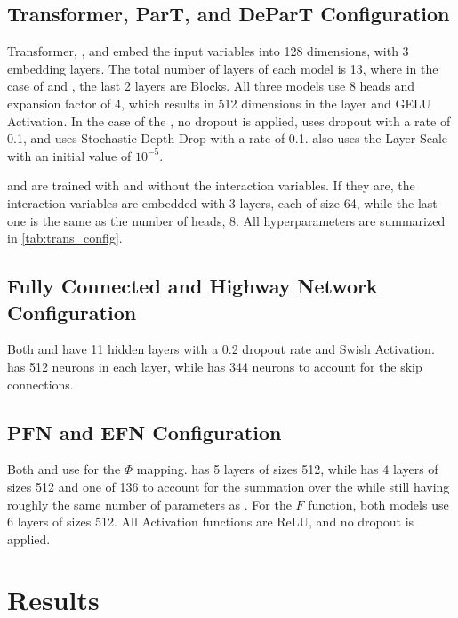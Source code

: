 \subsection{Transformer, ParT, and DeParT Configuration}
\label{sec:transformer_config}

Transformer, \ParT, and \depart embed the input variables into 128 dimensions, with 3 embedding layers.
The total number of layers of each model is 13, where in the case of \depart and \ParT, the last 2 layers are \CA Blocks.
All three models use 8 heads and \FFN expansion factor of 4, which results in 512 dimensions in the \FFN layer and GELU Activation.
In the case of the \trans, no dropout is applied, \ParT uses dropout with a rate of 0.1, and \depart uses Stochastic Depth Drop with a rate of 0.1.
\depart also uses the Layer Scale with an initial value of $10^{-5}$.

\ParT and \depart are trained with and without the interaction variables.
If they are, the interaction variables are embedded with 3 layers, each of size 64, while the last one is the same as the number of heads, 8.
All hyperparameters are summarized in \cref{tab:trans_config}.

\subsection{Fully Connected and Highway Network Configuration}
\label{sec:fc_config}

Both \fc and \highway have 11 hidden layers with a 0.2 dropout rate and Swish Activation.
\fc has 512 neurons in each layer, while \highway has 344 neurons to account for the skip connections.

\subsection{PFN and EFN Configuration}
\label{sec:efn_config}

Both \PFN and \EFN use \pointCNN for the $\Phi$ mapping. 
\PFN has 5 layers of sizes 512, while \EFN has 4 layers of sizes 512 and one of 136 to account for the summation over the \PFOs while still having roughly the same number of parameters as \PFN.
For the $F$ function, both models use 6 layers of sizes 512. 
All Activation functions are ReLU, and no dropout is applied.


\section{Results}
\label{sec:results}



